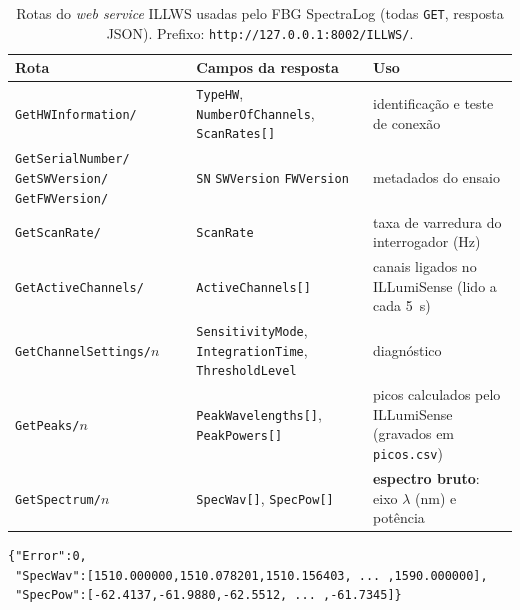 \documentclass[11pt,a4paper]{article}
\begin{document}
\begin{table}[htb]
\centering\small
\caption{Rotas do \emph{web service} ILLWS usadas pelo FBG SpectraLog (todas \texttt{GET}, resposta JSON).
Prefixo: \texttt{http://127.0.0.1:8002/ILLWS/}.}
\label{tab:rotas}
\begin{tabular}{@{}>{\raggedright\arraybackslash}p{3.9cm}>{\raggedright\arraybackslash}p{5.5cm}>{\raggedright\arraybackslash}p{6.0cm}@{}}
\toprule
Rota & Campos da resposta & Uso \\
\midrule
\texttt{GetHWInformation/} & \texttt{TypeHW}, \texttt{NumberOfChannels}, \texttt{ScanRates[]} & identificação e teste de conexão \\
\texttt{GetSerialNumber/} \newline \texttt{GetSWVersion/} \newline \texttt{GetFWVersion/} & \texttt{SN} \newline \texttt{SWVersion} \newline \texttt{FWVersion} & metadados do ensaio \\
\texttt{GetScanRate/} & \texttt{ScanRate} & taxa de varredura do interrogador (Hz) \\
\texttt{GetActiveChannels/} & \texttt{ActiveChannels[]} & canais ligados no ILLumiSense (lido a cada 5~s) \\
\texttt{GetChannelSettings/}$n$ & \texttt{SensitivityMode}, \texttt{IntegrationTime}, \texttt{ThresholdLevel} & diagnóstico \\
\texttt{GetPeaks/}$n$ & \texttt{PeakWavelengths[]}, \texttt{PeakPowers[]} & picos calculados pelo ILLumiSense (gravados em \texttt{picos.csv}) \\
\texttt{GetSpectrum/}$n$ & \texttt{SpecWav[]}, \texttt{SpecPow[]} & \textbf{espectro bruto}: eixo $\lambda$ (nm) e potência \\
\bottomrule
\end{tabular}
\end{table}

\begin{lstlisting}[caption={Resposta típica de \texttt{GetSpectrum/1} (vetores abreviados). \texttt{Error}=0 indica sucesso.},label={lst:json}]
{"Error":0,
 "SpecWav":[1510.000000,1510.078201,1510.156403, ... ,1590.000000],
 "SpecPow":[-62.4137,-61.9880,-62.5512, ... ,-61.7345]}
\end{lstlisting}
\end{document}
